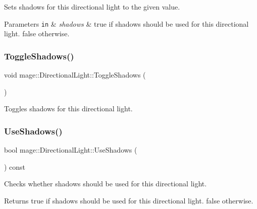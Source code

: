 Sets shadows for this directional light to the given value.


\begin{DoxyParams}[1]{Parameters}
\mbox{\tt in}  & {\em shadows} & {\ttfamily true} if shadows should be used for this directional light. {\ttfamily false} otherwise. \\
\hline
\end{DoxyParams}
\hypertarget{classmage_1_1_directional_light_a1c15d8e42526ed5ae7568cff5c7b25e0}{}\label{classmage_1_1_directional_light_a1c15d8e42526ed5ae7568cff5c7b25e0} 
\subsubsection{\texorpdfstring{Toggle\+Shadows()}{ToggleShadows()}}
{\footnotesize\ttfamily void mage\+::\+Directional\+Light\+::\+Toggle\+Shadows (\begin{DoxyParamCaption}{ }\end{DoxyParamCaption})\hspace{0.3cm}{\ttfamily [noexcept]}}

Toggles shadows for this directional light. \hypertarget{classmage_1_1_directional_light_a645e7f3d3e4dc4ebf11d7a6aa6950a18}{}\label{classmage_1_1_directional_light_a645e7f3d3e4dc4ebf11d7a6aa6950a18} 
\subsubsection{\texorpdfstring{Use\+Shadows()}{UseShadows()}}
{\footnotesize\ttfamily bool mage\+::\+Directional\+Light\+::\+Use\+Shadows (\begin{DoxyParamCaption}{ }\end{DoxyParamCaption}) const\hspace{0.3cm}{\ttfamily [noexcept]}}

Checks whether shadows should be used for this directional light.

\begin{DoxyReturn}{Returns}
{\ttfamily true} if shadows should be used for this directional light. {\ttfamily false} otherwise. 
\end{DoxyReturn}


